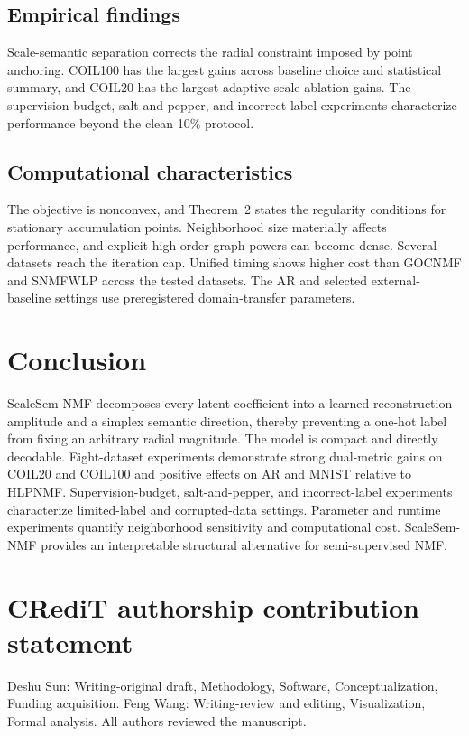 \documentclass[a4paper,preprint,12pt]{elsarticle}
\theoremstyle{remark}
\begin{document}
\subsection{Empirical findings}

Scale-semantic separation corrects the radial constraint imposed by point anchoring. COIL100 has the largest gains across baseline choice and statistical summary, and COIL20 has the largest adaptive-scale ablation gains. The supervision-budget, salt-and-pepper, and incorrect-label experiments characterize performance beyond the clean 10\% protocol.

\subsection{Computational characteristics}

The objective is nonconvex, and Theorem~2 states the regularity conditions for stationary accumulation points. Neighborhood size materially affects performance, and explicit high-order graph powers can become dense. Several datasets reach the iteration cap. Unified timing shows higher cost than GOCNMF and SNMFWLP across the tested datasets. The AR and selected external-baseline settings use preregistered domain-transfer parameters.

\section{Conclusion}

ScaleSem-NMF decomposes every latent coefficient into a learned reconstruction amplitude and a simplex semantic direction, thereby preventing a one-hot label from fixing an arbitrary radial magnitude. The model is compact and directly decodable. Eight-dataset experiments demonstrate strong dual-metric gains on COIL20 and COIL100 and positive effects on AR and MNIST relative to HLPNMF. Supervision-budget, salt-and-pepper, and incorrect-label experiments characterize limited-label and corrupted-data settings. Parameter and runtime experiments quantify neighborhood sensitivity and computational cost. ScaleSem-NMF provides an interpretable structural alternative for semi-supervised NMF.



\singlespacing
\section*{CRediT authorship contribution statement}
Deshu Sun: Writing-original draft, Methodology, Software,
Conceptualization, Funding acquisition. Feng Wang: Writing-review and editing, Visualization, Formal analysis. All authors reviewed the manuscript.
\end{document}
